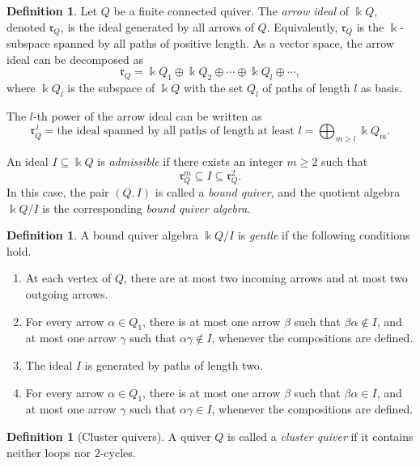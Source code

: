 \documentclass[11pt]{article}
\newcommand{\K}{\Bbbk}
\newcommand{\rad}{\mathfrak r}
\theoremstyle{plain}
\theoremstyle{definition}
\newtheorem{definition}[theorem]{Definition}
\theoremstyle{remark}
\begin{document}
\begin{definition}
Let $Q$ be a finite connected quiver. The \emph{arrow ideal} of \(\K Q\), denoted \(\rad_Q\), is the ideal generated by
all arrows of \(Q\).  Equivalently, \(\rad_Q\) is the \(\K\)-subspace spanned by
all paths of positive length.  
 As a vector space, the arrow ideal can be decomposed as
\[
\rad_{Q} = \K Q_{1} \oplus \K Q_{2} \oplus \cdots \oplus \K Q_{l} \oplus \cdots ,
\]
where \(\K Q_{l}\) is the subspace of \(\K Q\) with the set $Q_{l}$ of paths of length $l$ as basis.  

The $l$-th power of the arrow ideal can be written as 
\[
\rad_{Q}^{\,l} =\text{the ideal spanned by all paths of length at least }l= \bigoplus_{m \geq l} \K Q_{m}.
\]


An ideal \(I\subseteq \K Q\) is \emph{admissible} if there exists an integer
\(m\geq 2\) such that
\[
  \rad_Q^m\subseteq I\subseteq \rad_Q^2.
\]
In this case, the pair \((Q,I)\) is called a \emph{bound quiver}, and the quotient algebra \(\K Q/I\) is the
corresponding \emph{bound quiver algebra}.
\end{definition}

\begin{definition}
A bound quiver algebra \(\K Q/I\) is \emph{gentle} if the following conditions
hold.
\begin{enumerate}[label=(G\arabic*),leftmargin=2em]
  \item At each vertex of \(Q\), there are at most two incoming arrows and at
  most two outgoing arrows.
  \item For every arrow \(\alpha\in Q_1\), there is at most one arrow \(\beta\)
  such that \(\beta\alpha\notin I\), and at most one arrow \(\gamma\) such that
  \(\alpha\gamma\notin I\), whenever the compositions are defined.
  \item The ideal \(I\) is generated by paths of length two.
  \item For every arrow \(\alpha\in Q_1\), there is at most one arrow \(\beta\)
  such that \(\beta\alpha\in I\), and at most one arrow \(\gamma\) such that
  \(\alpha\gamma\in I\), whenever the compositions are defined.
\end{enumerate}
\end{definition}

\begin{definition} [Cluster quivers] A quiver \(Q\) is called a \emph{cluster quiver} if it contains neither loops nor $2$-cycles.


\end{definition}
\end{document}
